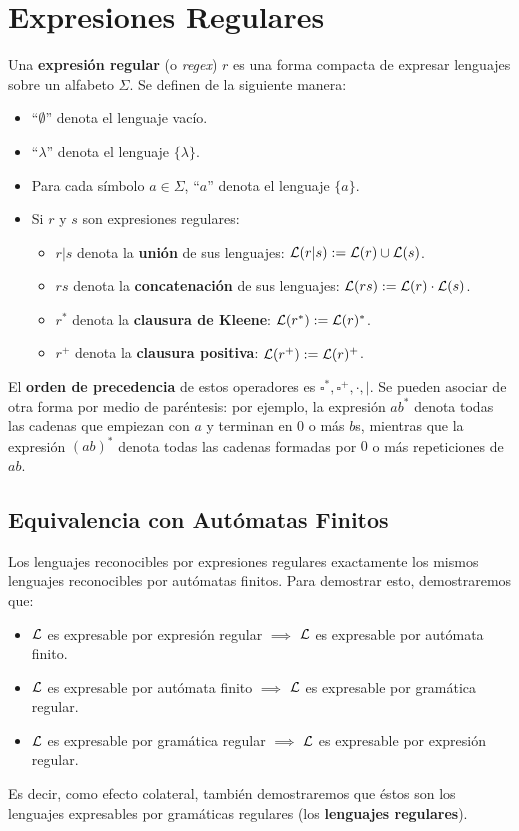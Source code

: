 
\section{Expresiones Regulares}

Una \textbf{expresión regular} (o \textit{regex}) $r$ es una forma compacta de expresar lenguajes sobre un alfabeto $\Sigma$. Se definen de la siguiente manera:
\begin{itemize}
    \item ``$\emptyset$'' denota el lenguaje vacío.
    \item ``$\lambda$'' denota el lenguaje $\{\lambda\}$.
    \item Para cada símbolo $a \in \Sigma$, ``$a$'' denota el lenguaje $\{a\}$.
    \item Si $r$ y $s$ son expresiones regulares:
          \begin{itemize}
              \item $r|s$ denota la \textbf{unión} de sus lenguajes: $\mathcal{L}(r|s) := \mathcal{L}(r) \cup \mathcal{L}(s)$.
              \item $rs$ denota la \textbf{concatenación} de sus lenguajes: $\mathcal{L}(rs) := \mathcal{L}(r) \cdot \mathcal{L}(s)$.
              \item $r^*$ denota la \textbf{clausura de Kleene}: $\mathcal{L}(r^*) := \mathcal{L}(r)^*$.
              \item $r^+$ denota la \textbf{clausura positiva}: $\mathcal{L}(r^+) := \mathcal{L}(r)^+$.
          \end{itemize}
\end{itemize}

El \textbf{orden de precedencia} de estos operadores es $\square^*, \square^+, \cdot, |$. Se pueden asociar de otra forma por medio de paréntesis: por ejemplo, la expresión $ab^*$ denota todas las cadenas que empiezan con $a$ y terminan en 0 o más $b$s, mientras que la expresión $(ab)^*$ denota todas las cadenas formadas por $0$ o más repeticiones de $ab$.

\subsection{Equivalencia con Autómatas Finitos}

Los lenguajes reconocibles por expresiones regulares exactamente los mismos lenguajes reconocibles por autómatas finitos. Para demostrar esto, demostraremos que:
\begin{itemize}
    \item $\mathcal{L}$ es expresable por expresión regular $\implies$ $\mathcal{L}$ es expresable por autómata finito.
    \item $\mathcal{L}$ es expresable por autómata finito $\implies$ $\mathcal{L}$ es expresable por gramática regular.
    \item $\mathcal{L}$ es expresable por gramática regular $\implies$ $\mathcal{L}$ es expresable por expresión regular.
\end{itemize}
Es decir, como efecto colateral, también demostraremos que éstos son los lenguajes expresables por gramáticas regulares (los \textbf{lenguajes regulares}).

